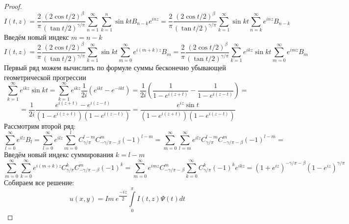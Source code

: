 \documentclass[12pt, a4paper]{extarticle}
\numberwithin{equation}{section}
\numberwithin{lemma}{section}
\numberwithin{definition}{section}
\numberwithin{notabene}{section}
\numberwithin{corollary}{section}
\begin{document}
\begin{proof}
\begin{equation*}
		I(t,z) =\dfrac{2}{\pi}\dfrac{(2\cos{t/2})^\beta}{(\tan{t/2})^{\gamma/\pi}} \sum\limits_{n=1}^{\infty}   \sum\limits_{k=1}^n \sin{kt} B_{n-k} e^{inz} = 
		\dfrac{2}{\pi}\dfrac{(2\cos{t/2})^\beta}{(\tan{t/2})^{\gamma/\pi}} \sum\limits_{k=1}^{\infty} \sin{kt} \sum\limits_{n=k}^{\infty} e^{inz} B_{n-k}
	\end{equation*}
	Введём новый индекс $m = n - k$
	\begin{equation*}
		I(t,z) = \dfrac{2}{\pi}\dfrac{(2\cos{t/2})^\beta}{(\tan{t/2})^{\gamma/\pi}} \sum\limits_{k=1}^{\infty} \sin{kt} \sum\limits_{m =0 }^{\infty} e^{i(m+k)z} B_{m} = 
		\dfrac{2}{\pi}\dfrac{(2\cos{t/2})^\beta}{(\tan{t/2})^{\gamma/\pi}} \sum\limits_{k=1}^{\infty} e^{ikz}\sin{kt} \sum\limits_{m =0 }^{\infty} e^{imz} B_{m}
	\end{equation*}
	Первый ряд можем вычислить по формуле суммы бесконечно убывающей геометрической прогрессии
	\begin{equation*}
		\sum\limits_{k=1}^{\infty} e^{ikz}\sin{kt} =  \sum\limits_{k=1}^{\infty} e^{ikz}\dfrac{1}{2i}\left(e^{ikt} - e^{-ikt}\right) = \dfrac1{2i} \left(\dfrac{1}{1 - e^{i(z+t)}} -  \dfrac{1}{1 - e^{i(z-t)}}\right) = 
	\end{equation*}
	\begin{equation*}
		= \dfrac{1}{2i}  \dfrac{e^{i(z+t)} - e^{i(z-t)}}{\left(1 - e^{i(z+t)} \right) \left(1 - e^{i(z-t)}\right)} =  \dfrac{e^{iz} \sin{t}}{\left(1 - e^{i(z+t)} \right) \left(1 - e^{i(z-t)}\right)}
	\end{equation*}
	Рассмотрим второй ряд:
	\begin{equation*}
		\sum\limits_{l =0 }^{\infty} e^{ilz} B_{l} = \sum\limits_{l =0 }^{\infty} e^{ilz} \sum\limits_{m=0}^{l} C^{l - m}_{\gamma/\pi} C^{m}_{-\gamma/\pi - \beta} (-1)^{l-m} = \sum\limits_{m=0}^{\infty} \sum\limits_{l=m}^{\infty} e^{ilz} C^{l - m}_{\gamma/\pi} C^{m}_{-\gamma/\pi - \beta} (-1)^{l-m} = 
	\end{equation*}
	Введём новый индекс суммирования $k = l -m$
	\begin{equation*}
		\sum\limits_{m=0}^{\infty} \sum\limits_{k=0}^{\infty} e^{i(m+k)z} C^{k}_{\gamma/\pi} C^{m}_{-\gamma/\pi - \beta} (-1)^{k} = \sum\limits_{m=0}^{\infty} e^{imz} C^{m}_{-\gamma/\pi - \beta} \sum\limits_{k=0}^{\infty}  C^{k}_{\gamma/\pi} (-1)^k e^{ikz} = (1 + e^{iz})^{-\gamma/\pi - \beta} (1- e^{iz})^{\gamma/\pi} 
	\end{equation*}
	Собираем все решение:
	\begin{equation*}
		u(x,y) = Im\ e^{\dfrac{-iz}{2}} \int\limits_0^\pi I(t,z) \Psi(t) dt

\end{equation*}
\end{proof}
\end{document}
